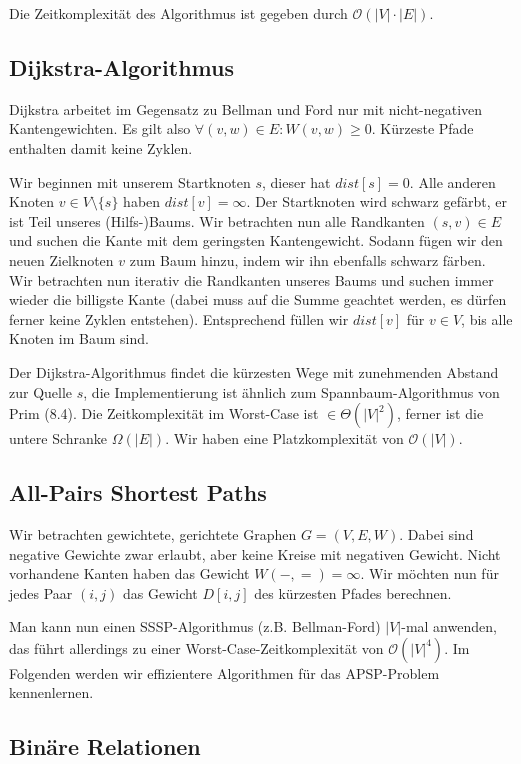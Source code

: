 \documentclass[12pt]{article}
\begin{document}
Die Zeitkomplexität des Algorithmus ist gegeben durch $\mathcal O(|V|\cdot{}|E|)$.

\subsection{Dijkstra-Algorithmus}

Dijkstra arbeitet im Gegensatz zu Bellman und Ford nur mit nicht-negativen Kantengewichten. Es gilt also $\forall (v, w) \in E : W(v, w) \geq 0$. Kürzeste Pfade enthalten damit keine Zyklen.

Wir beginnen mit unserem Startknoten $s$, dieser hat $dist[s] = 0$. Alle anderen Knoten $v \in V \setminus \{s\}$ haben $dist[v] = \infty$. Der Startknoten wird schwarz gefärbt, er ist Teil unseres (Hilfs-)Baums. Wir betrachten nun alle Randkanten $(s, v) \in E$ und suchen die Kante mit dem geringsten Kantengewicht. Sodann fügen wir den neuen Zielknoten $v$ zum Baum hinzu, indem wir ihn ebenfalls schwarz färben. Wir betrachten nun iterativ die Randkanten unseres Baums und suchen immer wieder die billigste Kante (dabei muss auf die Summe geachtet werden, es dürfen ferner keine Zyklen entstehen). Entsprechend füllen wir $dist[v]$ für $v \in V$, bis alle Knoten im Baum sind.

Der Dijkstra-Algorithmus findet die kürzesten Wege mit zunehmenden Abstand zur Quelle $s$, die Implementierung ist ähnlich zum Spannbaum-Algorithmus von Prim (8.4). Die Zeitkomplexität im Worst-Case ist $\in \Theta(|V|^2)$, ferner ist die untere Schranke $\Omega(|E|)$. Wir haben eine Platzkomplexität von $\mathcal O(|V|)$.

\subsection{All-Pairs Shortest Paths}

Wir betrachten gewichtete, gerichtete Graphen $G = (V, E, W)$. Dabei sind negative Gewichte zwar erlaubt, aber keine Kreise mit negativen Gewicht. Nicht vorhandene Kanten haben das Gewicht $W(-,=) = \infty$. Wir möchten nun für jedes Paar $(i, j)$ das Gewicht $D[i,j]$ des kürzesten Pfades berechnen.

Man kann nun einen SSSP-Algorithmus (z.B. Bellman-Ford) $|V|$-mal anwenden, das führt allerdings zu einer Worst-Case-Zeitkomplexität von $\mathcal O(|V|^4)$. Im Folgenden werden wir effizientere Algorithmen für das APSP-Problem kennenlernen.

\subsection{Binäre Relationen}
\end{document}
